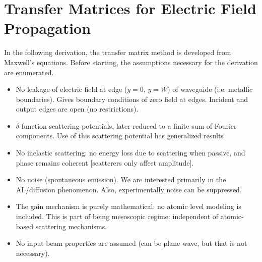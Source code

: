 \chapter{Transfer Matrices for Electric Field Propagation}
\label{sec:appendix_derivation_transfer_matrices_quasi1d}

In the following derivation, the transfer matrix method\cite{1981_MacKinnon_scaling}\cite{1992_Pendry}\cite{2003_Kettemann} is developed from Maxwell's equations\cite{1999_Jackson}. Before starting, the assumptions necessary for the derivation are enumerated. 
\begin{itemize}
\item No leakage of electric field at edge ($y=0$, $y=W$) of waveguide (i.e. metallic boundaries). Gives boundary conditions of zero field at edges. Incident and output edges are open (no restrictions).
\item $\delta$-function scattering potentials, later reduced to a finite sum of Fourier components. Use of this scattering potential has generalized results
\item No inelastic scattering: no energy loss due to scattering when passive, and phase remains coherent [scatterers only affect amplitude].
\item No noise (spontaneous emission). We are interested primarily in the AL/diffusion phenomenon. Also, experimentally noise can be suppressed. %
\item The gain mechanism is purely mathematical: no atomic level modeling is included. This is part of being mesoscopic regime: independent of atomic-based scattering mechanisms.
\item No input beam properties are assumed (can be plane wave, but that is not necessary).%
\end{itemize}

